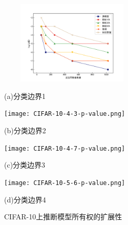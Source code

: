 \begin{figure}[htbp]%
	\centering
	\begin{minipage}[htbp]{0.49\linewidth}        %
		\hspace{2mm}
		\centering
		\includegraphics[width=7cm,height=4cm]{CIFAR-10-4-2-p-value.png}
		\centerline{(a)分类边界1}
	\end{minipage}
	\begin{minipage}[htbp]{0.49\linewidth}        %
		\hspace{2mm}
		\centering
		\texttt{[image: CIFAR-10-4-3-p-value.png]}
		\centerline{(b)分类边界2}
	\end{minipage}
	\begin{minipage}[htbp]{0.49\linewidth}        %
		\hspace{2mm}
		\centering
		\texttt{[image: CIFAR-10-4-7-p-value.png]}
		\centerline{(c)分类边界3}
	\end{minipage}
	\begin{minipage}[htbp]{0.49\linewidth}        %
		\hspace{2mm}
		\centering
		\texttt{[image: CIFAR-10-5-6-p-value.png]}
		\centerline{(d)分类边界4}
	\end{minipage}
\setlength{\abovecaptionskip}{7mm} %
\caption{CIFAR-10上推断模型所有权的扩展性}
\label{CIFAR-10上推断模型所有权的扩展性}
\end {figure}
	
